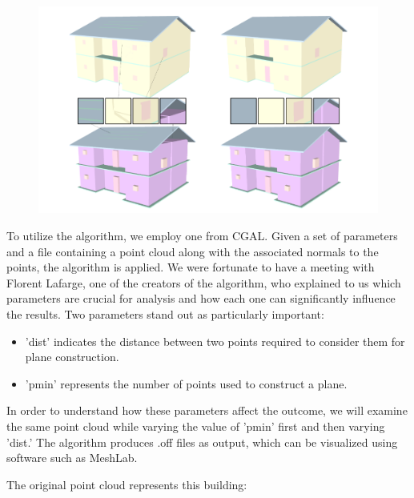 \documentclass{article}
\begin{document}
\begin{figure}[h]
    
\includegraphics[scale =   0.3 ]{../../images/example_algorithm.png}

\end{figure}


To utilize the algorithm, we employ one from CGAL. Given a set of parameters and a file containing a point cloud along with the associated normals to the points,
the algorithm is applied. We were fortunate to have a meeting with Florent Lafarge, one of the creators of the algorithm,
who explained to us which parameters are crucial for analysis and how each one can significantly influence the results.
Two parameters stand out as particularly important: 
\begin{itemize}
  \item 'dist' indicates the distance between two points required to consider them for plane construction.
  \item 'pmin' represents the number of points used to construct a plane.
\end{itemize}

In order to understand how these parameters affect the outcome, we will examine the same point cloud while varying the value of 'pmin' first and then varying 'dist.'
The algorithm produces .off files as output, which can be visualized using software such as MeshLab.

\newpage
The original point cloud represents this building:
\vspace{\baselineskip}
\end{document}
